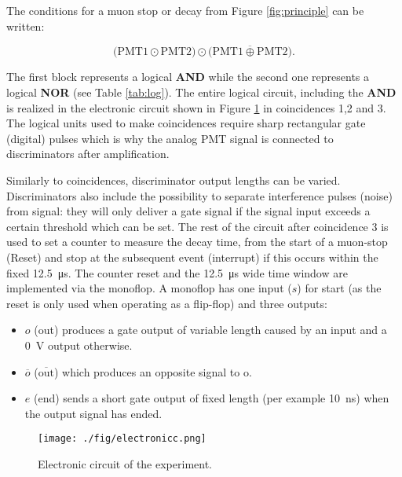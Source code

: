 The conditions for a muon stop or decay from Figure \ref{fig:principle} can be written:

\begin{equation}
\big(\text{PMT}1 \odot \text{PMT}2\big) \odot \big(\overline{\text{PMT}1 \oplus \text{PMT}2}\big).
\end{equation}

The first block represents a logical \textbf{AND} while the second one represents a logical \textbf{NOR} (see Table \ref{tab:log}). The entire logical circuit, including the \textbf{AND} is realized in the electronic circuit shown in Figure \ref{fig:elek} in coincidences 1,2 and 3. The logical units used to make coincidences require sharp rectangular gate (digital) pulses which is why the analog PMT signal is connected to discriminators after amplification. 


Similarly to coincidences, discriminator output lengths can be varied. Discriminators also include the possibility to separate interference pulses (noise) from signal: they will only deliver a gate signal if the signal input exceeds a certain threshold which can be set. The rest of the circuit after coincidence 3 is used to set a counter to measure the decay time, from the start of a muon-stop (Reset) and stop at the subsequent event (interrupt) if this occurs within the fixed \SI{12.5}{\micro\second}. The counter reset and the \SI{12.5}{\micro\second} wide time window are implemented via the monoflop. A monoflop has one input ($s$) for start (as the reset is only used when operating as a flip-flop) and three outputs:

\begin{itemize}
\item $o$ (out) produces a gate output of variable length caused by an input and a \SI{0}{\volt} output otherwise.
\item $\overline{o}$ ($\overline{\text{out}}$) which produces an opposite signal to o.
\item $e$ (end) sends a short gate output of fixed length (per example \SI{10}{\nano\second}) when the output signal has ended.
\end{itemize}

\begin{figure}[htbp]
\centering
\texttt{[image: ./fig/electronicc.png]}
\caption{Electronic circuit of the experiment.}
\label{fig:elek}
\end{figure}

